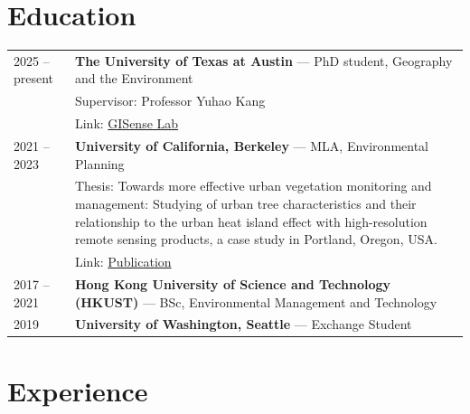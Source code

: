 \documentclass[a4paper,12pt]{article}
\begin{document}
\section{Education}
\begin{tabularx}{\linewidth}{@{}l X@{}}
2025 -- present &
\textbf{The University of Texas at Austin} --- PhD student, Geography and the Environment \\
& Supervisor: Professor Yuhao Kang \\
& Link: \href{https://sites.utexas.edu/gisense/}{GISense Lab}\\[3pt]

2021 -- 2023 &
\textbf{University of California, Berkeley} --- MLA, Environmental Planning \\[3pt]
& Thesis: Towards more effective urban vegetation monitoring and management: Studying of urban tree characteristics and
their relationship to the urban heat island effect with high-resolution remote sensing products, a case study in
Portland, Oregon, USA. \\
& Link: \href{https://doi.org/10.1016/j.landurbplan.2025.105420}{Publication} \\[3pt]

2017 -- 2021 &
\textbf{Hong Kong University of Science and Technology (HKUST)} --- BSc, Environmental Management and Technology \\[3pt]

2019 &
\textbf{University of Washington, Seattle} --- Exchange Student \\
\end{tabularx}

\section{Experience}
\end{document}
